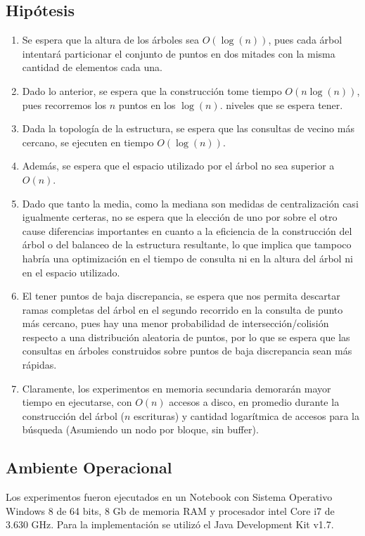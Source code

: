 \documentclass[12pt,letterpaper, margin = 3cm]{article}
\begin{document}
\subsection{Hipótesis}
\begin{enumerate}
\item Se espera que la altura de los árboles sea $O(\log(n))$, pues cada árbol intentará particionar el conjunto de puntos en dos mitades con la misma cantidad de elementos cada una.
\item Dado lo anterior, se espera que la construcción tome tiempo $O(n\log(n))$, pues recorremos los $n$ puntos en los $\log(n)$. niveles que se espera tener.
\item Dada la topología de la estructura, se espera que las consultas de vecino más cercano, se ejecuten en tiempo $O(\log(n))$.
\item Además, se espera que el espacio utilizado por el árbol no sea superior a $O(n)$.
\item Dado que tanto la media, como la mediana son medidas de centralización casi igualmente certeras, no se espera que la elección de uno por sobre el otro cause diferencias importantes en cuanto a la eficiencia de la construcción del árbol o del balanceo de la estructura resultante, lo que implica que tampoco habría una optimización en el tiempo de consulta ni en la altura del árbol ni en el espacio utilizado.
\item El tener puntos de baja discrepancia, se espera que nos permita descartar ramas completas del árbol en el segundo recorrido en la consulta de punto más cercano, pues hay una menor probabilidad de intersección/colisión respecto a una distribución aleatoria de puntos, por lo que se espera que las consultas en árboles construidos sobre puntos de baja discrepancia sean más rápidas.
\item Claramente, los experimentos en memoria secundaria demorarán mayor tiempo en ejecutarse, con $O(n)$ accesos a disco, en promedio durante la construcción del árbol ($n$ escrituras) y cantidad logarítmica de accesos para la búsqueda (Asumiendo un nodo por bloque, sin buffer).
\end{enumerate}

\subsection{Ambiente Operacional}
Los experimentos fueron ejecutados en un Notebook con Sistema Operativo Windows 8 de 64 bits, 8 Gb de
memoria RAM y procesador intel Core i7 de 3.630 GHz. Para la implementación se utilizó el Java Development Kit v1.7.
\end{document}
